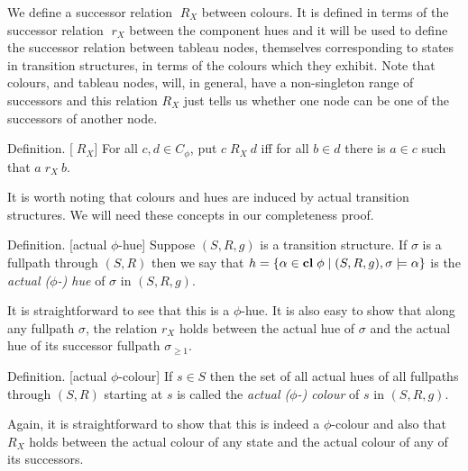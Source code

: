 \documentclass[submission,copyright,creativecommons]{eptcs}
\newcommand{\clos}{\mbox{{\bf cl}}\;}
\newcommand{\colourphi}{C_{\phi}}
\newcommand{\rX}{\; r_X}
\newcommand{\RCX}{\; R_X}
\newcommand{\vb}{\; | \;}
\newenvironment{definition}{Definition. }{}
\begin{document}
We define a successor relation
$\RCX$ between colours.
It is defined in terms of 
the successor relation
$\rX$ between
the component hues
and it will be used to define
the successor relation between
tableau nodes,
themselves
corresponding to
states in transition structures,
in terms of the colours which they exhibit.
Note that colours,
and tableau nodes, will,
in general, have a non-singleton range
of successors
and this relation $R_X$
just tells us whether one node
can be one of the
successors of another node.

\begin{definition}[$\RCX$]
For all $c,d \in \colourphi$,
put $c \RCX\ d$ iff
for all $b \in d$ there is $a \in c$ such that $a \rX\ b$.
\end{definition}

It is worth noting that colours and hues 
are induced by
actual transition structures.
We will need these concepts in our completeness proof.

\begin{definition}[actual $\phi$-hue]
Suppose $(S,R,g)$ is a transition structure.
If $\sigma$ is a fullpath through $(S,R)$ then
we say that 
$h= \{ \alpha \in \clos \phi \vb 
(S,R,g), \sigma \models \alpha \}$
is the
{\em actual ($\phi$-) hue}
of $\sigma$ in $(S,R,g)$.
\end{definition}

It is straightforward to see that 
this is a $\phi$-hue.
It is also easy to show that
along any fullpath $\sigma$,
the relation
$r_X$ holds between the actual hue
of $\sigma$
and 
the actual hue 
of its successor 
fullpath $\sigma_{\geq 1}$.

\begin{definition}[actual $\phi$-colour]
If $s \in S$ then
the set of all actual hues 
of all fullpaths through $(S,R)$
starting at $s$
is called the 
{\em actual ($\phi$-) colour}
of $s$ in $(S,R,g)$.
\end{definition}

Again, it is straightforward
to show that this is indeed a
$\phi$-colour
and also that $R_X$
holds between the actual colour
of any state and
the actual colour
of any of its successors.
\end{document}
